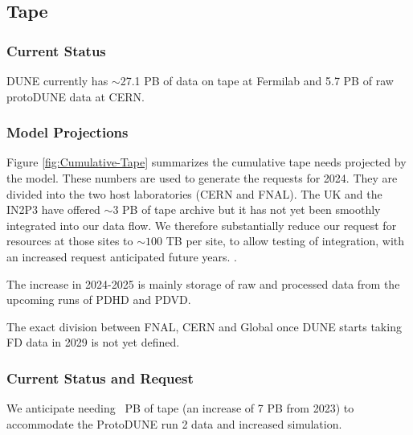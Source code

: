 \documentclass[12pt]{article}
\begin{document}
\subsection{Tape}

\subsubsection{Current Status}

DUNE currently has $\sim$27.1 PB of data\cite{fnaltape} on tape at Fermilab and 5.7 PB of raw protoDUNE data  at CERN\cite{scotgrid}. 

\subsubsection{Model Projections}

Figure  \ref{fig:Cumulative-Tape}  summarizes the cumulative  tape needs projected by  the model. These numbers are used to generate the requests for 2024.  They are divided into the two host laboratories (CERN and FNAL). The UK and the IN2P3 have offered $\sim 3$ PB of tape archive  but it has not yet been smoothly integrated into our data flow.  We  therefore substantially reduce our request for  resources  at those sites to $\sim 100$ TB per site, to allow testing of integration, with an increased request anticipated future years. .

The increase in 2024-2025 is mainly storage of raw and processed  data from the upcoming runs of PDHD and PDVD.

The exact division between FNAL, CERN and Global once DUNE starts taking FD data in 2029 is not yet defined.  



\subsubsection{Current Status and Request}\label{sec:taperesult}
 We anticipate needing \TAPETotal\ PB of tape (an increase of 7 PB from 2023) to accommodate the ProtoDUNE run 2 data and increased simulation. 
\end{document}
